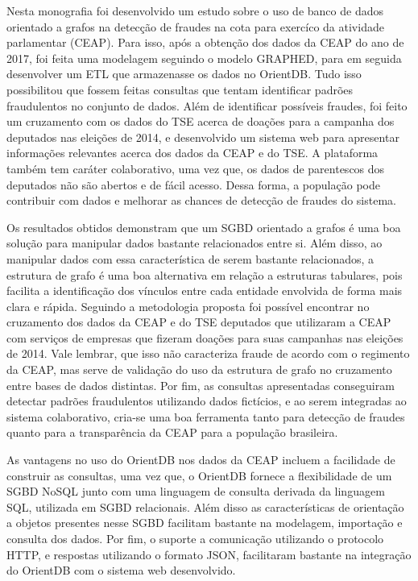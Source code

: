 Nesta monografia foi desenvolvido um estudo sobre o uso de banco de dados orientado a grafos na detecção de fraudes na cota para exercíco da atividade parlamentar (CEAP). Para isso, após a obtenção dos dados da CEAP do ano de 2017, foi feita uma modelagem seguindo o modelo GRAPHED, para em seguida desenvolver um ETL que armazenasse os dados no OrientDB. Tudo isso possibilitou que fossem feitas consultas que tentam identificar padrões fraudulentos no conjunto de dados. Além de identificar possíveis fraudes, foi feito um cruzamento com os dados do TSE acerca de doações para a campanha dos deputados nas eleições de 2014, e desenvolvido um sistema web para apresentar informações relevantes acerca dos dados da CEAP e do TSE. A plataforma também tem caráter colaborativo, uma vez que, os dados de parentescos dos deputados não são abertos e de fácil acesso. Dessa forma, a população pode contribuir com dados e melhorar as chances de detecção de fraudes do sistema.

Os resultados obtidos demonstram que um SGBD orientado a grafos é uma boa solução para manipular dados bastante relacionados entre si. Além disso, ao manipular dados com essa característica de serem bastante relacionados, a estrutura de grafo é uma boa alternativa em relação a estruturas tabulares, pois facilita a identificação dos vínculos entre cada entidade envolvida de forma mais clara e rápida. Seguindo a metodologia proposta foi possível encontrar no cruzamento dos dados da CEAP e do TSE deputados que utilizaram a CEAP com serviços de empresas que fizeram doações para suas campanhas nas eleições de 2014. Vale lembrar, que isso não caracteriza fraude de acordo com o regimento da CEAP, mas serve de validação do uso da estrutura de grafo no cruzamento entre bases de dados distintas. Por fim, as consultas apresentadas conseguiram detectar padrões fraudulentos utilizando dados fictícios, e ao serem integradas ao sistema colaborativo, cria-se uma boa ferramenta tanto para detecção de fraudes quanto para a transparência da CEAP para a população brasileira.

As vantagens no uso do OrientDB nos dados da CEAP incluem a facilidade de construir as consultas, uma vez que, o OrientDB fornece a flexibilidade de um SGBD NoSQL junto com uma linguagem de consulta derivada da linguagem SQL, utilizada em SGBD relacionais. Além disso as características de orientação a objetos presentes nesse SGBD facilitam bastante na modelagem, importação e consulta dos dados. Por fim, o suporte a comunicação utilizando o protocolo HTTP, e respostas utilizando o formato JSON, facilitaram bastante na integração do OrientDB com o sistema web desenvolvido.

